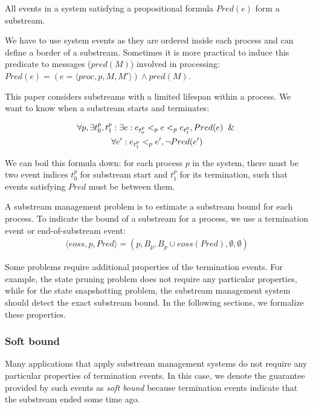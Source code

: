\begin{definition}[Substream]
All events in a system satisfying a propositional formula $Pred(e)$ form a substream.
\end{definition}

We have to use system events as they are ordered inside each process and can define a border of a substream. Sometimes it is more practical to induce this predicate to messages ($pred(M)$) involved in processing: $Pred(e) = (e = \langle proc, p, M, M'\rangle) \wedge pred(M)$.

This paper considers substreams with a limited lifespan within a process. We want to know when a substream starts and terminates: 

\begin{multline}
\forall p, \exists t_0^p, t_1^p: \exists e: e_{t_0^p} <_p e <_p e_{t_1^p}, Pred(e) \And \\ \forall e': e_{t_1^p} <_p e', \neg Pred(e') 
\end{multline}

We can boil this formula down: for each process $p$ in the system, there must be two event indices $t_0^p$ for substream start and $t_1^p$ for its termination, such that events satisfying $Pred$ must be between them. 

\begin{definition}
A substream management problem is to estimate a substream bound for each process. To indicate the bound of a substream for a process, we use a termination event or end-of-substream event:
\begin{multline}
  \langle eoss, p, Pred \rangle = (p, B_p, B_p\cup eoss(Pred), \emptyset, \emptyset)  
\end{multline}
\end{definition}

Some problems require additional properties of the termination events. For example, the state pruning problem does not require any particular properties, while for the state snapshotting problem, the substream management system should detect the exact substream bound. In the following sections, we formalize these properties. 

\subsubsection{Soft bound}

Many applications that apply substream management systems do not require any particular properties of termination events. In this case, we denote the guarantee provided by such events as {\em soft bound} because termination events indicate that the substream ended some time ago.

